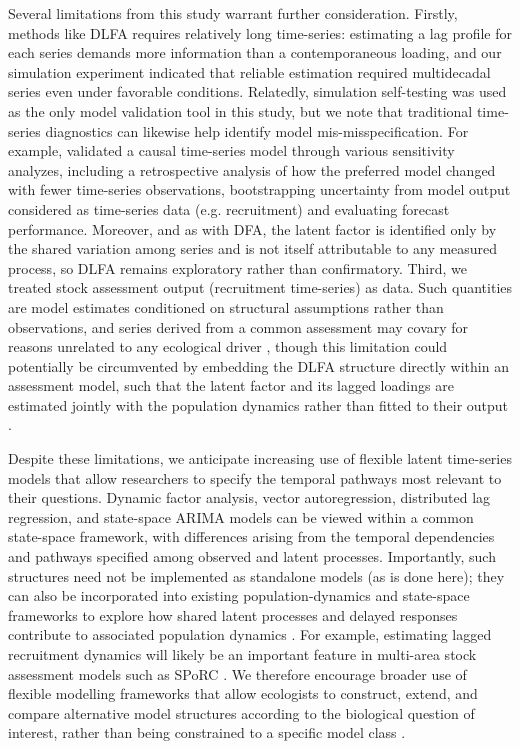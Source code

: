 \documentclass[12pt]{article}
\begin{document}
Several limitations from this study warrant further consideration.
Firstly, methods like DLFA requires relatively long time-series:
estimating a lag profile for each series demands more information than a
contemporaneous loading, and our simulation experiment indicated that
reliable estimation required multidecadal series even under favorable
conditions. Relatedly, simulation self-testing was used as the only
model validation tool in this study, but we note that traditional
time-series diagnostics can likewise help identify model
mis-misspecification. For example, \citet{ma_leveraging_2026} validated
a causal time-series model through various sensitivity analyzes,
including a retrospective analysis of how the preferred model changed
with fewer time-series observations, bootstrapping uncertainty from
model output considered as time-series data (e.g. recruitment) and
evaluating forecast performance. Moreover, and as with DFA, the latent
factor is identified only by the shared variation among series and is
not itself attributable to any measured process, so DLFA remains
exploratory rather than confirmatory. Third, we treated stock assessment
output (recruitment time-series) as data. Such quantities are model
estimates conditioned on structural assumptions rather than
observations, and series derived from a common assessment may covary for
reasons unrelated to any ecological driver \citep{brooks_when_2015},
though this limitation could potentially be circumvented by embedding
the DLFA structure directly within an assessment model, such that the
latent factor and its lagged loadings are estimated jointly with the
population dynamics rather than fitted to their output
\citep{champagnat_causal_2026}.

Despite these limitations, we anticipate increasing use of flexible latent time-series models that
allow researchers to specify the temporal pathways most relevant to
their questions. Dynamic factor analysis, vector autoregression,
distributed lag regression, and state-space ARIMA models can be viewed
within a common state-space framework, with differences arising from the
temporal dependencies and pathways specified among observed and latent
processes. Importantly, such structures need not be implemented as
standalone models (as is done here); they can also be incorporated into
existing population-dynamics and state-space frameworks to explore how
shared latent processes and delayed responses contribute to associated
population dynamics \citep{champagnat_causal_2026}. For example,
estimating lagged recruitment dynamics will likely be an important
feature in multi-area stock assessment models such as SPoRC
\citep{cheng_sporc_2026}. We therefore encourage broader use of flexible
modelling frameworks that allow ecologists to construct, extend, and
compare alternative model structures according to the biological
question of interest, rather than being constrained to a specific model
class \citep{thorson_dynamic_2024}.
\end{document}
